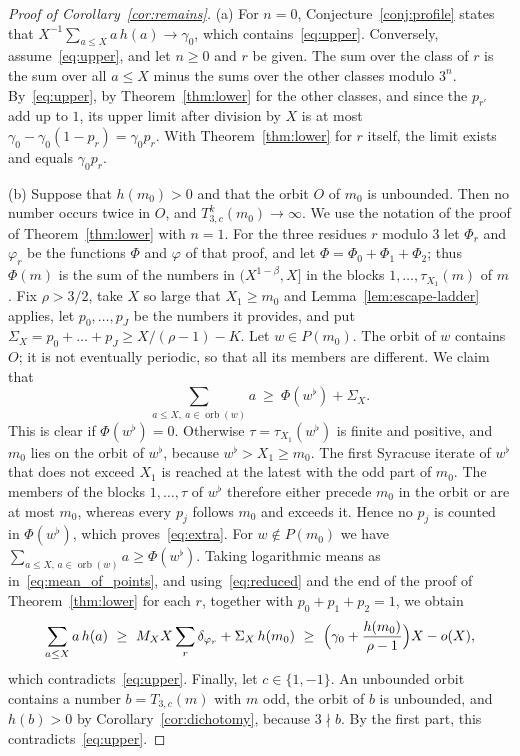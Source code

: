 \documentclass[12pt]{amsart}
\theoremstyle{definition}
\theoremstyle{remark}
\begin{document}
\begin{proof}[Proof of Corollary~\ref{cor:remains}]
(a) For $n=0$, Conjecture~\ref{conj:profile} states that $X^{-1}\sum_{a\le X}a\,h(a)\to\gamma_0$, which contains~\eqref{eq:upper}. Conversely, assume~\eqref{eq:upper}, and let $n\ge0$ and $r$ be given. The sum over the class of $r$ is the sum over all $a\le X$ minus the sums over the other classes modulo $3^n$. By~\eqref{eq:upper}, by Theorem~\ref{thm:lower} for the other classes, and since the $p_{r'}$ add up to $1$, its upper limit after division by $X$ is at most $\gamma_0-\gamma_0(1-p_r)=\gamma_0p_r$. With Theorem~\ref{thm:lower} for $r$ itself, the limit exists and equals $\gamma_0p_r$.

(b) Suppose that $h(m_0)>0$ and that the orbit $O$ of $m_0$ is unbounded. Then no number occurs twice in $O$, and $T_{3,c}^k(m_0)\to\infty$. We use the notation of the proof of Theorem~\ref{thm:lower} with $n=1$. For the three residues $r$ modulo $3$ let $\Phi_r$ and $\varphi_r$ be the functions $\Phi$ and $\varphi$ of that proof, and let $\Phi=\Phi_0+\Phi_1+\Phi_2$; thus $\Phi(m)$ is the sum of the numbers in $(X^{1-\beta},X]$ in the blocks $1,\ldots,\tau_{X_1}(m)$ of $m$. Fix $\rho>3/2$, take $X$ so large that $X_1\ge m_0$ and Lemma~\ref{lem:escape-ladder} applies, let $p_0,\ldots,p_J$ be the numbers it provides, and put $\Sigma_X=p_0+\dots+p_J\ge X/(\rho-1)-K$. Let $w\in P(m_0)$. The orbit of $w$ contains $O$; it is not eventually periodic, so that all its members are different. We claim that
\begin{equation}
\label{eq:extra}
\sum_{a\le X,\ a\in\operatorname{orb}(w)}a\ \ge\ \Phi(w^\flat)+\Sigma_X .
\end{equation}
This is clear if $\Phi(w^\flat)=0$. Otherwise $\tau=\tau_{X_1}(w^\flat)$ is finite and positive, and $m_0$ lies on the orbit of $w^\flat$, because $w^\flat>X_1\ge m_0$. The first Syracuse iterate of $w^\flat$ that does not exceed $X_1$ is reached at the latest with the odd part of $m_0$. The members of the blocks $1,\ldots,\tau$ of $w^\flat$ therefore either precede $m_0$ in the orbit or are at most $m_0$, whereas every $p_j$ follows $m_0$ and exceeds it. Hence no $p_j$ is counted in $\Phi(w^\flat)$, which proves~\eqref{eq:extra}. For $w\notin P(m_0)$ we have $\sum_{a\le X,\,a\in\operatorname{orb}(w)}a\ge\Phi(w^\flat)$. Taking logarithmic means as in~\eqref{eq:mean_of_points}, and using~\eqref{eq:reduced} and the end of the proof of Theorem~\ref{thm:lower} for each $r$, together with $p_0+p_1+p_2=1$, we obtain
\[
\sum_{a\le X}a\,h(a)\ \ge\ M_XX\sum_{r}\delta_{\varphi_r}+\Sigma_X\,h(m_0)\ \ge\ \Bigl(\gamma_0+\frac{h(m_0)}{\rho-1}\Bigr)X-o(X),
\]
which contradicts~\eqref{eq:upper}. Finally, let $c\in\{1,-1\}$. An unbounded orbit contains a number $b=T_{3,c}(m)$ with $m$ odd, the orbit of $b$ is unbounded, and $h(b)>0$ by Corollary~\ref{cor:dichotomy}, because $3\nmid b$. By the first part, this contradicts~\eqref{eq:upper}.
\end{proof}
\end{document}
